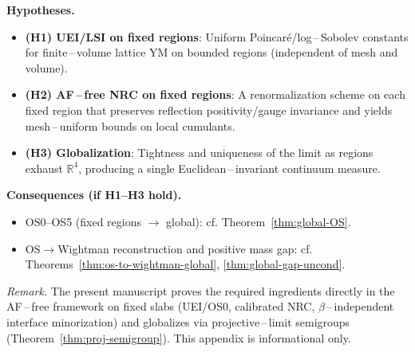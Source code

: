 \documentclass[11pt]{amsart}
\theoremstyle{plain}
\theoremstyle{definition}
\theoremstyle{remark}
\begin{document}
\begin{mdframed}[linewidth=0.5pt, linecolor=gray!40, backgroundcolor=gray!6, roundcorner=2pt, innertopmargin=6pt, innerbottommargin=6pt]
\textbf{Hypotheses.}
\begin{itemize}[leftmargin=2em, itemsep=3pt]
  \item \textbf{(H1) UEI/LSI on fixed regions}: Uniform Poincar\'e/log\,–\,Sobolev constants for finite\,–\,volume lattice YM on bounded regions (independent of mesh and volume).
  \item \textbf{(H2) AF\,–\,free NRC on fixed regions}: A renormalization scheme on each fixed region that preserves reflection positivity/gauge invariance and yields mesh\,–\,uniform bounds on local cumulants.
  \item \textbf{(H3) Globalization}: Tightness and uniqueness of the limit as regions exhaust $\mathbb R^4$, producing a single Euclidean\,–\,invariant continuum measure.
\end{itemize}
\textbf{Consequences (if H1–H3 hold).}
\begin{itemize}[leftmargin=2em, itemsep=3pt]
  \item OS0–OS5 (fixed regions $\to$ global): cf. Theorem~\ref{thm:global-OS}.
  \item OS$\to$Wightman reconstruction and positive mass gap: cf. Theorems~\ref{thm:os-to-wightman-global}, \ref{thm:global-gap-uncond}.
\end{itemize}
\end{mdframed}

\noindent\emph{Remark.} The present manuscript proves the required ingredients directly in the AF\,–\,free framework on fixed slabs (UEI/OS0, calibrated NRC, $\beta$\,–\,independent interface minorization) and globalizes via projective\,–\,limit semigroups (Theorem~\ref{thm:proj-semigroup}). This appendix is informational only.
\end{document}
